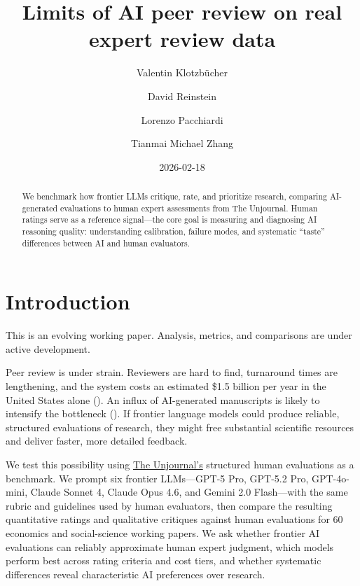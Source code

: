 \documentclass[
  11pt,
  letterpaper,
]{article}
\title{Limits of AI peer review on real expert review data}
\author{Valentin Klotzbücher \and David Reinstein \and Lorenzo
Pacchiardi \and Tianmai Michael Zhang}
\date{2026-02-18}
\begin{document}
\maketitle
\begin{abstract}
We benchmark how frontier LLMs critique, rate, and prioritize research,
comparing AI-generated evaluations to human expert assessments from The
Unjournal. Human ratings serve as a reference signal---the core goal is
measuring and diagnosing AI reasoning quality: understanding
calibration, failure modes, and systematic ``taste'' differences between
AI and human evaluators.
\end{abstract}



\section{Introduction}\label{introduction}

\begin{tcolorbox}[enhanced jigsaw, toptitle=1mm, breakable, opacityback=0, colback=white, rightrule=.15mm, opacitybacktitle=0.6, colbacktitle=quarto-callout-note-color!10!white, bottomrule=.15mm, leftrule=.75mm, colframe=quarto-callout-note-color-frame, coltitle=black, bottomtitle=1mm, titlerule=0mm, arc=.35mm, title=\textcolor{quarto-callout-note-color}{\faInfo}\hspace{0.5em}{Working paper}, toprule=.15mm, left=2mm]

This is an evolving working paper. Analysis, metrics, and comparisons
are under active development.

\end{tcolorbox}

Peer review is under strain. Reviewers are hard to find, turnaround
times are lengthening, and the system costs an estimated \$1.5 billion
per year in the United States alone
(). An
influx of AI-generated manuscripts is likely to intensify the bottleneck
(). If frontier language models
could produce reliable, structured evaluations of research, they might
free substantial scientific resources and deliver faster, more detailed
feedback.

We test this possibility using \href{https://unjournal.org}{The
Unjournal's} structured human evaluations as a benchmark. We prompt six
frontier LLMs---GPT-5 Pro, GPT-5.2 Pro, GPT-4o-mini, Claude Sonnet 4,
Claude Opus 4.6, and Gemini 2.0 Flash---with the same rubric and
guidelines used by human evaluators, then compare the resulting
quantitative ratings and qualitative critiques against human evaluations
for 60 economics and social-science working papers. We ask whether
frontier AI evaluations can reliably approximate human expert judgment,
which models perform best across rating criteria and cost tiers, and
whether systematic differences reveal characteristic AI preferences over
research.
\end{document}
